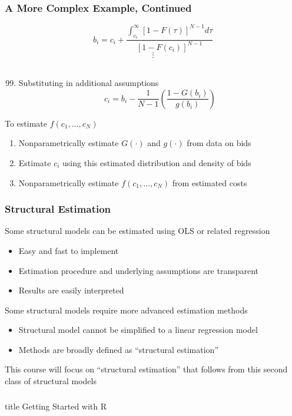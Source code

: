 \documentclass{beamer}\usepackage[]{graphicx}\usepackage[]{color}
\begin{document}
\begin{frame}\frametitle{A More Complex Example, Continued}
    $$b_i = c_i + \frac{\int_{c_i}^\infty [1 - F(\tau)]^{N - 1} d\tau}{[1 - F(c_i)]^{N - 1}}$$
    $$\vdots$$ \\
    \begin{enumerate}
        \setcounter{enumi}{98}
        \item Substituting in additional assumptions
        $$c_i = b_i - \frac{1}{N - 1} \left( \frac{1 - G(b_i)}{g(b_i)} \right)$$
    \end{enumerate}
    To estimate $f(c_1, \ldots, c_N)$
    \begin{enumerate}
        \item Nonparametrically estimate $G(\cdot)$ and $g(\cdot)$ from data on bids
        \item Estimate $c_i$ using this estimated distribution and density of bids
        \item Nonparametrically estimate $f(c_1, \ldots, c_N)$ from estimated costs
    \end{enumerate}
\end{frame}

\begin{frame}\frametitle{Structural Estimation}
    Some structural models can be estimated using OLS or related regression
    \begin{itemize}
        \item Easy and fast to implement
        \item Estimation procedure and underlying assumptions are transparent
        \item Results are easily interpreted
    \end{itemize}
    \vspace{3ex}
    Some structural models require more advanced estimation methods
    \begin{itemize}
        \item Structural model cannot be simplified to a linear regression model
        \item Methods are broadly defined as ``structural estimation''
    \end{itemize}
    \vspace{3ex}
    This course will focus on ``structural estimation'' that follows from this second class of structural models
\end{frame}

\begin{frame}\frametitle{}
    \vfill
    \centering
    \begin{beamercolorbox}[center]{title}
        \Large Getting Started with R
    \end{beamercolorbox}
    \vfill
\end{frame}
\end{document}
